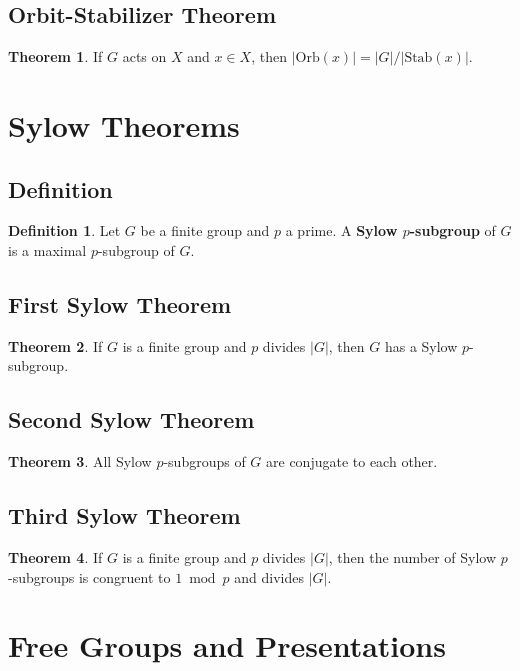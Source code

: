 \documentclass[11pt]{article}
\theoremstyle{definition}
\newtheorem{definition}{Definition}[section]
\newtheorem{theorem}{Theorem}[section]
\begin{document}
\subsection{Orbit-Stabilizer Theorem}
\begin{theorem}
If $G$ acts on $X$ and $x \in X$, then $|\text{Orb}(x)| = |G|/|\text{Stab}(x)|$.
\end{theorem}

\section{Sylow Theorems}

\subsection{Definition}
\begin{definition}
Let $G$ be a finite group and $p$ a prime. A \textbf{Sylow $p$-subgroup} of $G$ is a maximal $p$-subgroup of $G$.
\end{definition}

\subsection{First Sylow Theorem}
\begin{theorem}
If $G$ is a finite group and $p$ divides $|G|$, then $G$ has a Sylow $p$-subgroup.
\end{theorem}

\subsection{Second Sylow Theorem}
\begin{theorem}
All Sylow $p$-subgroups of $G$ are conjugate to each other.
\end{theorem}

\subsection{Third Sylow Theorem}
\begin{theorem}
If $G$ is a finite group and $p$ divides $|G|$, then the number of Sylow $p$-subgroups is congruent to $1 \bmod p$ and divides $|G|$.
\end{theorem}

\section{Free Groups and Presentations}
\end{document}
